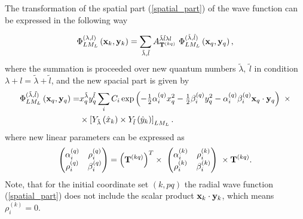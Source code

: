 \documentclass[
12pt, %
oneside, %
english, %
onehalfspacing, %
onehalfspacing, %
headsepline, %
]{MastersDoctoralThesis} %
\begin{document}
The transformation of the spatial part (\ref{spatial_part}) of the wave function can be expressed in the following way \cite{suzuki1998stochastic, kukulin1990dynamic}

  \begin{equation}
 \label{transform_spatial_part}
 \Phi^{(\lambda,l)}_{LM_L}\left( {\bf x}_k, {\bf y}_k \right) = \sum_{\tilde{\lambda}, \tilde{l}} A^{\tilde{\lambda} \tilde{l} \lambda l}_{{\bf T}^{(kq)} }~
  \Phi_{LM_L}^{(\tilde{\lambda},\tilde{l}) } \left(  {\bf x}_q, {\bf y}_q \right) ,
 \end{equation}
where the summation is proceeded over new quantum numbers $\tilde{\lambda},~\tilde{l}$ in condition $\lambda+l=\tilde{\lambda}+\tilde{l}$, and the new spacial part is given by
\begin{align}
 \Phi_{LM_L}^{(\tilde{\lambda},\tilde{l}) } \left(  {\bf x}_q, {\bf y}_q \right)  =  &
x^{\tilde{\lambda}}_q y^{\tilde{l}}_q 
\sum_i C_i 
\exp\left( - \tfrac{1}{2} \alpha_i^{(q)} x^2_q -\tfrac{1}{2}  \beta_i^{(q)} y^2_q 
- \alpha_i^{(q)} \beta_i^{(q)}  {\bf x}_q \cdot {\bf y}_q 
   \right)~
\times \nonumber \\
& \times \left[ 
Y_{\tilde{\lambda}} \left(\hat{x}_k \right) \times Y_{\tilde{l}} \left(\hat{y}_k \right)
\right]_{LM_L}.
\label{new_spacial_part}
\end{align}
where new linear parameters can be expressed as
\begin{align}
\begin{pmatrix}
\alpha_i^{(q)} & \rho_i^{(q)} \\ 
\rho_i^{(q)} & \beta_i^{(q)}
\end{pmatrix}  = \left( {\bf T}^{(kq)} \right)^{T} \times  ~
\begin{pmatrix}
\alpha_i^{(k)} & \rho_i^{(k)} \\ 
\rho_i^{(k)} & \beta_i^{(k)}
\end{pmatrix} ~ \times
  {\bf T}^{(kq)}.
\end{align}
Note, that for the initial  coordinate set $(k,pq)$ the radial wave function (\ref{spatial_part}) does not include the scalar product ${\bf x}_k \cdot {\bf y}_k$, which means $\rho_i^{(k)}=0$.  
\end{document}
